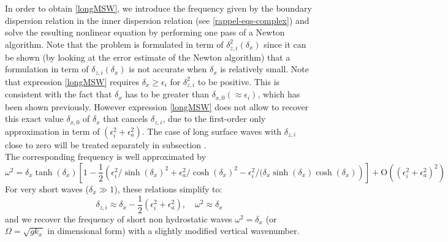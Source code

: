 In order to obtain \ref{longMSW}, we introduce the frequency given by the boundary dispersion relation in the inner dispersion relation (see \ref{rappel-eqs-complex}) and solve the resulting nonlinear equation by performing one pass of a Newton algorithm. Note that the problem is formulated in term of $\delta_{z,i}^2(\delta_x)$ since it can be shown (by looking at the error estimate of the Newton algorithm) that a formulation in term of $\delta_{z,i}(\delta_x)$ is not accurate when $\delta_x$ is relatively small.
Note that expression \ref{longMSW} requires $\delta_x \ge \epsilon_i$ for $\delta_{z,i}^2$ to be positive. This is consistent with the fact that $\delta_x$ has to be greater than $\delta_{x,0} (\approx \epsilon_i)$, which has been shown previously. However expression \ref{longMSW} does not allow to recover this exact value $\delta_{x,0}$ of $\delta_x$ that cancels $\delta_{z,i}$, due to the first-order only approximation in term of $(\epsilon_i^2+\epsilon_a^2)$. The case of long surface waves with $\delta_{z,i}$ close to zero will be treated separately in  subsection .
\\
The corresponding frequency is well approximated by
\begin{equation}
\omega^2=\delta_x \tanh(\delta_x)
\left[1-\frac{1}{2}\left(
\epsilon_i^2/\sinh(\delta_x)^2+\epsilon_a^2/\cosh(\delta_x)^2-\epsilon_i^2/(\delta_x\sinh(\delta_x)\cosh(\delta_x)
\right)
\right]+\mathrm{O}	((\epsilon_i^2+\epsilon_a^2)^2)
\label{eqomegasurfacewaves}
\end{equation}
%
For very short waves ($\delta_x \gg 1$), these relations simplify to:
\[
\delta_{z,i}\approx \delta_x
-\frac{1}{2}\left(
\epsilon_i^2+\epsilon_a^2
\right)
,\quad
\omega^2\approx \delta_x
\]
and we recover the frequency of short non hydrostatic waves $\omega^2 = \delta_x$ (or $\Omega=\sqrt{gk_x}$ in dimensional form) with a slightly modified vertical wavenumber.
%
%
